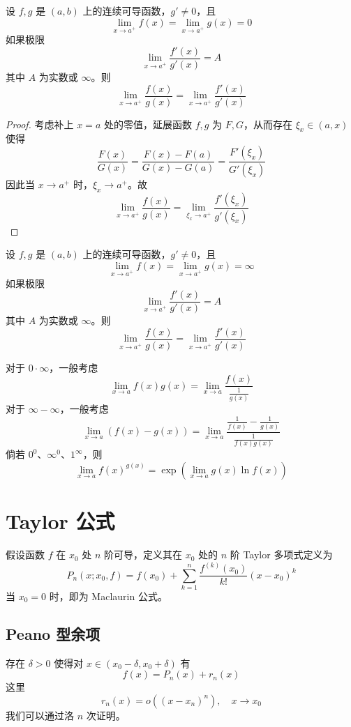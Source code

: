 \begin{theorem}[L'Hospital 法则，0/0 型]
	设 $f,g$ 是 $(a,b)$ 上的连续可导函数，$g' \neq 0$，且
	\[ \lim_{x \to a^{+}} f(x) = \lim_{x \to a^{+}} g(x) = 0 \]
	如果极限
	\[ \lim_{x \to a^{+}} \frac{f'(x)}{g'(x)} = A \]
	其中 $A$ 为实数或 $\infty$。则
	\[ \lim_{x \to a^{+}} \frac{f(x)}{g(x)} = \lim_{x \to a^{+}} \frac{f'(x)}{g'(x)} \]
\end{theorem}

\begin{proof}
	考虑补上 $x=a$ 处的零值，延展函数 $f, g$ 为 $F, G$，从而存在 $\xi_x \in (a, x)$ 使得
	\[ \frac{F(x)}{G(x)} = \frac{F(x) - F(a)}{G(x) - G(a)} = \frac{F'(\xi_x)}{G'(\xi_x)} \]
	因此当 $x \to a^+$ 时，$\xi_x \to a^+$。故
	\[ \lim_{x \to a^{+}} \frac{f(x)}{g(x)} = \lim_{\xi_x \to a^{+}} \frac{f'(\xi_x)}{g'(\xi_x)} \]
\end{proof}

\begin{theorem}[L'Hospital 法则，0/0 型]
	设 $f,g$ 是 $(a,b)$ 上的连续可导函数，$g' \neq 0$，且
	\[ \lim_{x \to a^{+}} f(x) = \lim_{x \to a^{+}} g(x) = \infty \]
	如果极限
	\[ \lim_{x \to a^{+}} \frac{f'(x)}{g'(x)} = A \]
	其中 $A$ 为实数或 $\infty$。则
	\[ \lim_{x \to a^{+}} \frac{f(x)}{g(x)} = \lim_{x \to a^{+}} \frac{f'(x)}{g'(x)} \]
\end{theorem}

对于 $0 \cdot \infty$，一般考虑
\[ \lim_{x \to a} f(x) g(x) = \lim_{x \to a} \frac{f(x)}{\frac{1}{g(x)}} \]
对于 $\infty - \infty$，一般考虑
\[ \lim_{x \to a} (f(x) - g(x)) = \lim_{x \to a} \frac{\frac{1}{f(x)} - \frac{1}{g(x)}}{\frac{1}{f(x)g(x)}} \]
倘若 $0^0$、$\infty^0$、$1^\infty$，则
\[ \lim_{x \to a} f(x)^{g(x)} = \exp \left(\lim_{x \to a} g(x) \ln f(x) \right) \]

\section{Taylor 公式}

假设函数 $f$ 在 $x_0$ 处 $n$ 阶可导，定义其在 $x_0$ 处的 $n$ 阶 Taylor 多项式定义为
\[ P_n(x;x_0, f) = f(x_0) + \sum_{k=1}^{n} \frac{f^{(k)}(x_0)}{k!} (x-x_0)^k \]
当 $x_0 = 0$ 时，即为 Maclaurin 公式。

\subsection{Peano 型余项}
存在 $\delta > 0$ 使得对 $x \in (x_0 - \delta, x_0 + \delta)$ 有
\[ f(x) = P_n(x) + r_n(x) \]
这里
\[ r_n(x) = o((x-x_n)^n), \quad x \to x_0 \]
我们可以通过洛 $n$ 次证明。


